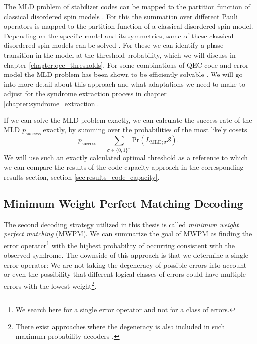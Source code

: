 The MLD problem of stabilizer codes can be mapped to the partition function of classical disordered spin models \cite{topological_quantum_memory}. 
For this the summation over different Pauli operators is mapped to the partition function of a classical disordered spin model.
Depending on the specific model and its symmetries, some of these classical disordered spin models can be solved \cite{topological_quantum_memory,fundamental_thresholds}.
For these we can identify a phase transition in the model at the threshold probability, which we will discuss in chapter \ref{chapter:qec_thresholds}. 
For some combinations of QEC code and error model the MLD problem has been shown to be efficiently solvable \cite{efficient_decoding_algorithm}.
We will go into more detail about this approach and what adaptations we need to make to adjust for the syndrome extraction process in chapter \ref{chapter:syndrome_extraction}. 

If we can solve the MLD problem exactly, we can calculate the success rate of the MLD $p_{\text{success}}$ exactly, 
by summing over the probabilities of the most likely cosets 
\begin{equation}
    p_{\text{success}} = \sum_{\sigma \in \{0,1\}^m} \text{Pr}(\bar{L}_{\text{MLD};\sigma}\mathcal{S}).
\end{equation}
We will use such an exactly calculated optimal threshold as a reference to which we can compare the results of the code-capacity approach in the corresponding results section, section \ref{sec:results_code_capacity}.


\subsection{Minimum Weight Perfect Matching Decoding}\label{ssec:general_MWMP_decoder}


The second decoding strategy utilized in this thesis is called \emph{minimum weight perfect matching} (MWPM)\cite{pymatching,pymatching_loger_paper}.
We can summarize the goal of MWPM as finding the error operator\footnote{
    We search here for a single error operator and not for a class of errors.
    } with the highest probability of occurring consistent with the observed syndrome.
The downside of this approach is that we determine a single error operator: 
We are not taking the degeneracy of possible errors into account or 
even the possibility that different logical classes of errors could have multiple errors with the lowest weight\footnote{
    There exist approaches where the degeneracy is also included in such maximum probability decoders \cite{degeneracy_enhanced_mp_decoding}.
}.

